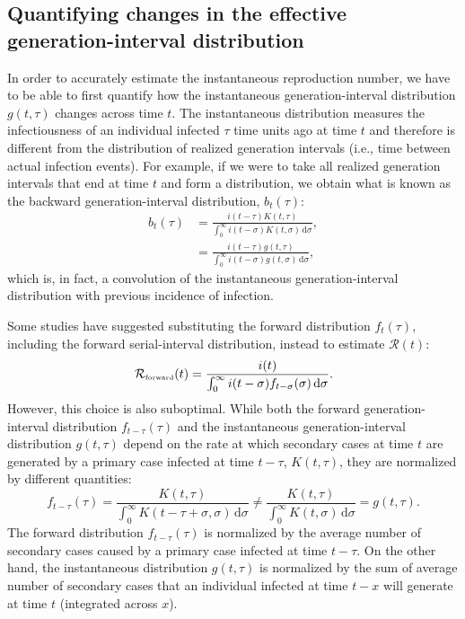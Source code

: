 \documentclass[12pt]{article}
\newcommand{\RR}{\ensuremath{{\mathcal R}}\xspace}
\newcommand{\tsub}[2]{#1_{{\textrm{\tiny #2}}}}
\newcommand{\dd}[1]{\ensuremath{\, \mathrm{d}#1}}
\newcommand{\dsigma}{\dd{\sigma}}
\begin{document}
\subsection{Quantifying changes in the effective generation-interval distribution}

In order to accurately estimate the instantaneous reproduction number, we have to be able to first quantify how the instantaneous generation-interval distribution $g(t, \tau)$ changes across time $t$.
The instantaneous distribution measures the infectiousness of an individual infected $\tau$ time units ago at time $t$ and therefore is different from the distribution of realized generation intervals (i.e., time between actual infection events).
For example, if we were to take all realized generation intervals that end at time $t$ and form a distribution, we obtain what is known as the backward generation-interval distribution, $b_t(\tau)$:
\begin{align}
b_t(\tau) &= \frac{i(t-\tau) K(t,\tau)}{\int_0^\infty i(t-\sigma) K(t,\sigma) \dsigma},\\
&= \frac{i(t-\tau) g(t,\tau)}{\int_0^\infty i(t-\sigma) g(t,\sigma) \dsigma},
\end{align}
which is, in fact, a convolution of the instantaneous generation-interval distribution with previous incidence of infection.

Some studies have suggested substituting the forward distribution $f_t(\tau)$, including the forward serial-interval distribution, instead to estimate $\RR(t)$:
\begin{equation}
\tsub{\RR}{forward}(t) = \frac{i(t)}{\int_0^\infty i(t-\sigma) f_{t-\sigma}(\sigma) \dsigma}.
\end{equation}
However, this choice is also suboptimal.
While both the forward generation-interval distribution $f_{t-\tau}(\tau)$ and the instantaneous generation-interval distribution $g(t, \tau)$ depend on the rate at which secondary cases at time $t$ are generated by a primary case infected at time $t-\tau$, $K(t, \tau)$, they are normalized by different quantities:
\begin{equation}
f_{t-\tau}(\tau) = \frac{K(t,\tau)}{\int_0^\infty K(t-\tau+\sigma,\sigma) \dsigma} \neq \frac{K(t,\tau)}{\int_0^\infty K(t,\sigma) \dsigma} = g(t, \tau).
\end{equation}
The forward distribution $f_{t-\tau}(\tau)$ is normalized by the average number of secondary cases caused by a primary case infected at time $t-\tau$.
On the other hand, the instantaneous distribution $g(t, \tau)$ is normalized by the sum of average number of secondary cases that an individual infected at time $t-x$ will generate at time $t$ (integrated across $x$).
\end{document}
